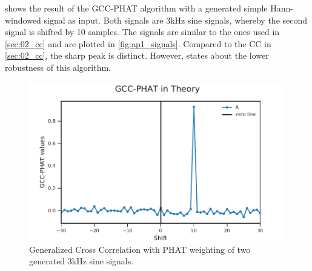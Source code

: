  shows the result of the \ac{GCC-PHAT} algorithm with a generated
simple Hann-windowed signal as input. Both signals are 3\si{\kilo\hertz} sine signals, whereby
the second signal is shifted by 10 samples.
The signals are similar to the ones used in \cref{sec:02_cc}
and are plotted in \cref{fig:ap1_signals}.
Compared to the \ac{CC} in \cref{sec:02_cc}, the sharp peak is distinct.
However, \cite{K_C_GCC} states about the lower robustness of this algorithm.
\begin{figure}[ht]
	\centering
		\includegraphics[width=1\columnwidth]{figures/GCC_theory}
	\caption{Generalized Cross Correlation with PHAT weighting of two generated 3\si{\kilo\hertz} sine signals.}
    \label{fig:03_gccTheory}
\end{figure}

